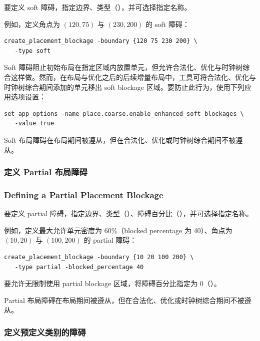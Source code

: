 要定义 soft 障碍，指定边界、类型（），并可选择指定名称。

例如，定义角点为 $(120, 75)$ 与 $(230, 200)$ 的 soft 障碍：
\begin{lstlisting}
create_placement_blockage -boundary {120 75 230 200} \
   -type soft
\end{lstlisting}

Soft 障碍阻止初始布局在指定区域内放置单元，但允许合法化、优化与时钟树综合这样做。然而，在布局与优化之后的后续增量布局中，工具可将合法化、优化与时钟树综合期间添加的单元移出 soft blockage 区域。要防止此行为，使用下列应用选项设置：
\begin{lstlisting}
set_app_options -name place.coarse.enable_enhanced_soft_blockages \
   -value true
\end{lstlisting}

\begin{noteBox}
Soft 布局障碍在布局期间被遵从，但在合法化、优化或时钟树综合期间不被遵从。
\end{noteBox}

\subsubsection{定义 Partial 布局障碍}
\subsubsection*{Defining a Partial Placement Blockage}

要定义 partial 障碍，指定边界、类型（）、障碍百分比（），并可选择指定名称。

例如，定义最大允许单元密度为 60\%（blocked percentage 为 40）、角点为 $(10, 20)$ 与 $(100, 200)$ 的 partial 障碍：
\begin{lstlisting}
create_placement_blockage -boundary {10 20 100 200} \
   -type partial -blocked_percentage 40
\end{lstlisting}

要允许无限制使用 partial blockage 区域，将障碍百分比指定为 0（）。

\begin{noteBox}
Partial 布局障碍在布局期间被遵从，但在合法化、优化或时钟树综合期间不被遵从。
\end{noteBox}

\subsubsection{定义预定义类别的障碍}
